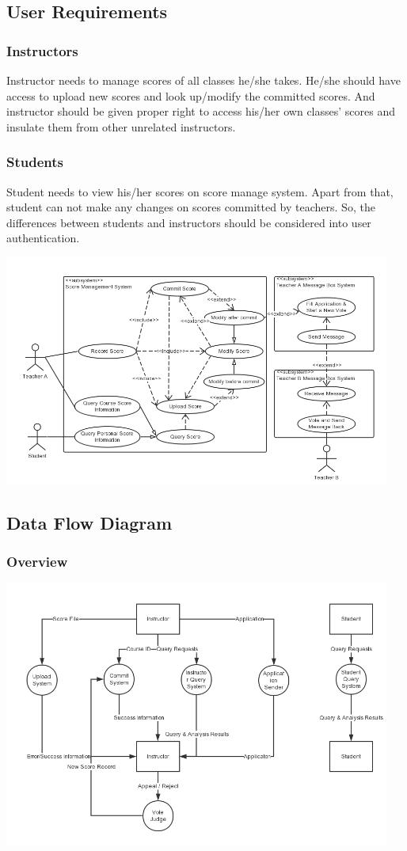 \documentclass[a4]{article}
\begin{document}
\subsection{User Requirements}
\subsubsection{Instructors}
Instructor needs to manage scores of all classes he/she takes. He/she should have access to upload new scores and look up/modify the committed scores. And instructor should be given proper right to access his/her own classes' scores and insulate them from other
unrelated instructors.
\subsubsection{Students}
Student needs to view his/her scores on score manage system. Apart from that, student can not make any changes on scores committed by teachers. So, the differences between students and instructors should be considered into user authentication.

\includegraphics[width=5in]{pic/1.png}
\subsection{Data Flow Diagram}
\subsubsection{Overview}
\includegraphics[width=5in]{pic/2-0.png}
\end{document}
